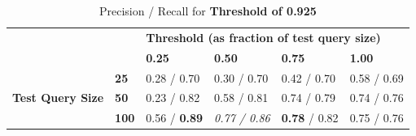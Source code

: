 \documentclass[11pt]{IEEEtran}
\begin{document}
\begin{table}[]
\centering
\caption{Precision / Recall for \textbf{Threshold of 0.925}}
\label{t925}
\begin{tabular}{ll|llll}
\cline{3-6}
                                                       &              & \multicolumn{4}{l|}{\textbf{Threshold (as fraction of test query size)}}                                                                          \\ \cline{3-6} 
\textbf{}                                              &              & \multicolumn{1}{l|}{\textbf{0.25}} & \multicolumn{1}{l|}{\textbf{0.50}} & \multicolumn{1}{l|}{\textbf{0.75}} & \multicolumn{1}{l|}{\textbf{1.00}} \\ \hline
\multicolumn{1}{|l|}{\multirow{3}{*}{\textbf{Test Query Size}}} & \textbf{25}  & 0.28 / 0.70                         & 0.30 / 0.70                         & 0.42 / 0.70                        & 0.58 / 0.69                        \\ \cline{2-2}
\multicolumn{1}{|l|}{}                                 & \textbf{50}  & 0.23 / 0.82                        & 0.58 / 0.81                         & 0.74 / 0.79                         & 0.74 / 0.76                        \\ \cline{2-2}
\multicolumn{1}{|l|}{}                                 & \textbf{100} & 0.56 / \textbf{0.89}                          & \emph{0.77 / 0.86}                    & \textbf{0.78} / 0.82                         & 0.75 / 0.76                          \\ \cline{1-2}
\end{tabular}
\end{table}
\end{document}
